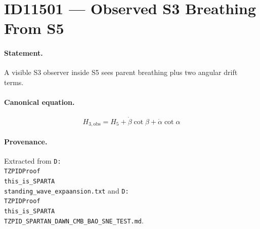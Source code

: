 \section*{ID11501 --- Observed S3 Breathing From S5}

\paragraph{Statement.}
A visible S3 observer inside S5 sees parent breathing plus two angular drift terms.

\paragraph{Canonical equation.}
\[
H_{3,\mathrm{obs}}=H_5+\dot\beta\cot\beta+\dot\alpha\cot\alpha
\]

\paragraph{Provenance.}
Extracted from \texttt{D:\\TZPIDProof\\this\_is\_SPARTA\\standing\_wave\_expaansion.txt} and \texttt{D:\\TZPIDProof\\this\_is\_SPARTA\\TZPID\_SPARTAN\_DAWN\_CMB\_BAO\_SNE\_TEST.md}.
